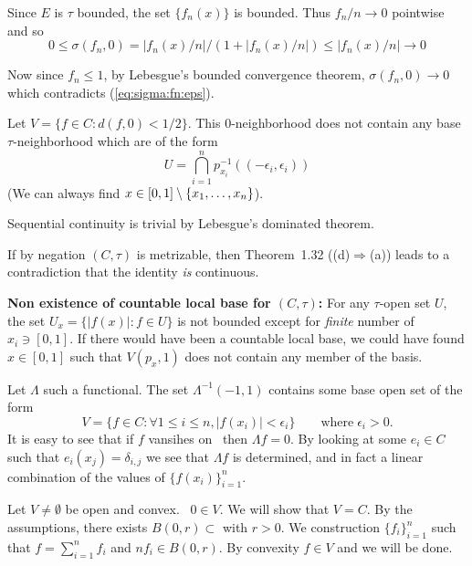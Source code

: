 \begin{enumerate}
\begin{itemize}
   Since $E$ is \(\tau\) bounded, the set \(\{f_n(x)\}\) is bounded.
   Thus \(f_n/n \rightarrow 0\) pointwise and so 
   \begin{equation*}
   0 \leq \sigma(f_n,0) = 
   |f_n(x)/n|/\left(1 + |f_n(x)/n|\right)  \leq |f_n(x)/n| \rightarrow 0
   \end{equation*}

   Now since \(f_n \leq 1\), by Lebesgue's 
   bounded convergence theorem, \(\sigma(f_n,0) \rightarrow 0\)
   which contradicts (\ref{eq:sigma:fn:eps}).

   Let \(V = \{f\in C: d(f,0)<1/2\}\).
   This $0$-neighborhood does not contain any base \(\tau\)-neighborhood
   which are of the form 
   \begin{equation*}
     U = \bigcap_{i=1}^n p_{x_i}^{-1}\left((-\epsilon_i,\epsilon_i)\right)
   \end{equation*}
   (We can always find \(x \in [0,1]\setminus\{x_1,\ldots,x_{n}\}\)).

   Sequential continuity is trivial 
   by Lebesgue's  dominated theorem.

   If by negation \((C,\tau)\) is metrizable, then 
   Theorem~1.32 ({\small(d)\(\Rightarrow\)(a)}) \cite{RudinFA79}
   leads to a contradiction that the identity \emph{is} continuous.
   

   \textbf{Non existence of countable local base for \((C,\tau)\):}\newline
   For any \(\tau\)-open set $U$, the set \(U_x = \{|f(x)|: f\in U\}\)
   is not bounded except for \emph{finite} number of \(x_i\ni[0,1]\).
   If there would have been a countable local base, we could have
   found \(x\in[0,1]\) such that \(V(p_x,1)\) does not contain any
   member of the basis.
 
   Let \(\Lambda\) such a functional. The set \(\Lambda^{-1}(-1,1)\)
   contains some base open set of the form 
   \begin{equation*}
    V = \{f\in C: \forall 1\leq i\leq n, |f(x_i)| < \epsilon_i\}
      \qquad \textrm{where}\; \epsilon_i > 0.
   \end{equation*}
   It is easy to see that if $f$ vansihes on \seqxn\ then \(\Lambda f = 0\).
   By looking at some \(e_i\in C\) such that \(e_i(x_j) = \delta_{i,j}\)
   we see that \(\Lambda f\) is determined, and in fact a linear combination
   of the values of \(\{f(x_i)\}_{i=1}^n\).

   Let \(V\neq\emptyset\) be open and convex.
   \Wlogy\ \(0\in V\). We will show that \(V=C\).
   By the assumptions, there exists \(B(0,r)\subset \) with \(r>0\).
   We construction \(\{f_i\}_{i=1}^n\) such that \(f=\sum_{i=1}^n f_i\)
   and \(nf_i\in B(0,r)\). By convexity \(f\in V\) and we will be done.



\end{itemize}
\end{enumerate}
